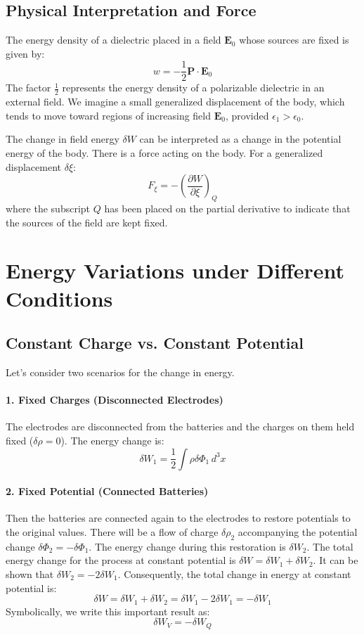 \documentclass{article}
\newcommand{\vect}[1]{\mathbf{#1}}
\begin{document}
	\subsection{Physical Interpretation and Force}
	The energy density of a dielectric placed in a field $\vect{E}_0$ whose sources are fixed is given by:
	$$
	w = -\frac{1}{2} \vect{P} \cdot \vect{E}_0
	$$
	The factor $\frac{1}{2}$ represents the energy density of a polarizable dielectric in an external field. We imagine a small generalized displacement of the body, which tends to move toward regions of increasing field $\vect{E}_0$, provided $\epsilon_1 > \epsilon_0$.
	
	The change in field energy $\delta W$ can be interpreted as a change in the potential energy of the body. There is a force acting on the body. For a generalized displacement $\delta \xi$:
	$$
	F_\xi = -\left( \frac{\partial W}{\partial \xi} \right)_Q
	$$
	where the subscript $Q$ has been placed on the partial derivative to indicate that the sources of the field are kept fixed.
	
	\section{Energy Variations under Different Conditions}
	
	\subsection{Constant Charge vs. Constant Potential}
	Let's consider two scenarios for the change in energy.
	
	\paragraph{1. Fixed Charges (Disconnected Electrodes)}
	The electrodes are disconnected from the batteries and the charges on them held fixed ($\delta \rho = 0$). The energy change is:
	$$
	\delta W_1 = \frac{1}{2} \int \rho \delta \Phi_1 \,d^3x
	$$
	
	\paragraph{2. Fixed Potential (Connected Batteries)}
	Then the batteries are connected again to the electrodes to restore potentials to the original values. There will be a flow of charge $\delta \rho_2$ accompanying the potential change $\delta \Phi_2 = -\delta \Phi_1$. The energy change during this restoration is $\delta W_2$. The total energy change for the process at constant potential is $\delta W = \delta W_1 + \delta W_2$. It can be shown that $\delta W_2 = -2\delta W_1$.
	Consequently, the total change in energy at constant potential is:
	$$
	\delta W = \delta W_1 + \delta W_2 = \delta W_1 - 2\delta W_1 = -\delta W_1
	$$
	Symbolically, we write this important result as:
	$$
	\delta W_V = -\delta W_Q
	$$
	
\end{document}
